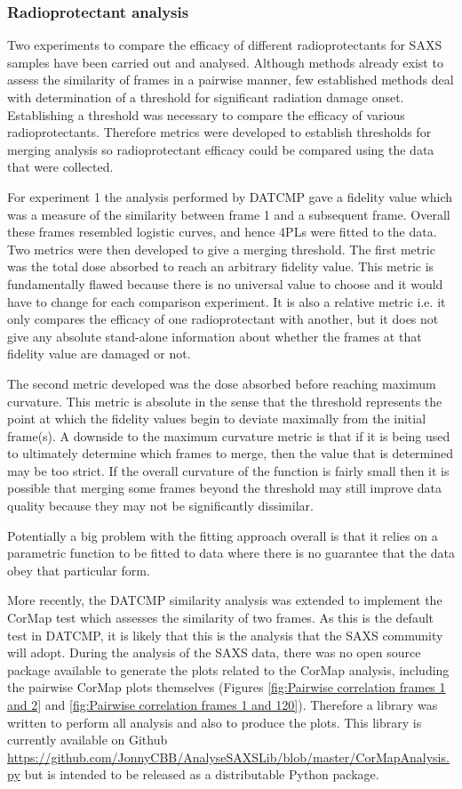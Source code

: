 \subsubsection{Radioprotectant analysis}
\label{subs:Radioprotectant analysis}
Two experiments to compare the efficacy of different radioprotectants for SAXS samples have been carried out and analysed.
Although methods already exist to assess the similarity of frames in a pairwise manner, few established methods deal with determination of a threshold for significant radiation damage onset.
Establishing a threshold was necessary to compare the efficacy of various radioprotectants.
Therefore metrics were developed to establish thresholds for merging analysis so radioprotectant efficacy could be compared using the data that were collected.

For experiment 1 the analysis performed by DATCMP gave a fidelity value which was a measure of the similarity between frame 1 and a subsequent frame.
Overall these frames resembled logistic curves, and hence 4PLs were fitted to the data.
Two metrics were then developed to give a merging threshold.
The first metric was the total dose absorbed to reach an arbitrary fidelity value.
This metric is fundamentally flawed because there is no universal value to choose and it would have to change for each comparison experiment.
It is also a relative metric i.e. it only compares the efficacy of one radioprotectant with another, but it does not give any absolute stand-alone information about whether the frames at that fidelity value are damaged or not.

The second metric developed was the dose absorbed before reaching maximum curvature.
This metric is absolute in the sense that the threshold represents the point at which the fidelity values begin to deviate maximally from the initial frame(s).
A downside to the maximum curvature metric is that if it is being used to ultimately determine which frames to merge, then the value that is determined may be too strict.
If the overall curvature of the function is fairly small then it is possible that merging some frames beyond the threshold may still improve data quality because they may not be significantly dissimilar.

Potentially a big problem with the fitting approach overall is that it relies on a parametric function to be fitted to data where there is no guarantee that the data obey that particular form.

More recently, the DATCMP similarity analysis was extended to implement the CorMap test which assesses the similarity of two frames.
As this is the default test in DATCMP, it is likely that this is the analysis that the SAXS community will adopt.
During the analysis of the SAXS data, there was no open source package available to generate the plots related to the CorMap analysis, including the pairwise CorMap plots themselves (Figures \ref{fig:Pairwise correlation frames 1 and 2} and \ref{fig:Pairwise correlation frames 1 and 120}).
Therefore a library was written to perform all analysis and also to produce the plots.
This library is currently available on Github \url{https://github.com/JonnyCBB/AnalyseSAXSLib/blob/master/CorMapAnalysis.py} but is intended to be released as a distributable Python package.

